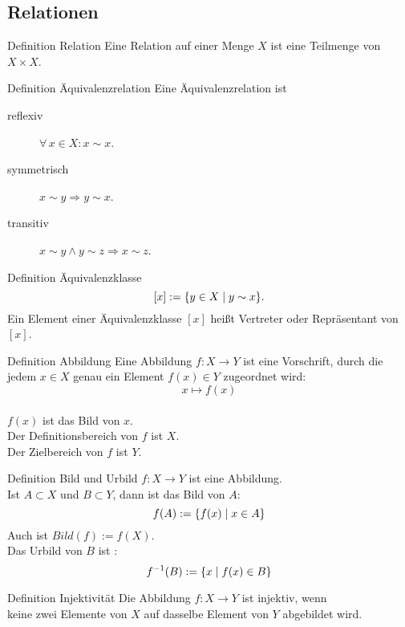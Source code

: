 \documentclass[a6paper,11pt,print,grid=front]{kartei}
\begin{document}
\subsection*{Relationen}
\begin{karte}{Definition Relation}
    Eine Relation auf einer Menge \(X\)  ist eine Teilmenge 
    von \( X \times X \).
\end{karte}
\begin{karte}{Definition Äquivalenzrelation}
    Eine Äquivalenzrelation ist 
    \begin{description}
        \item[reflexiv] \( \forall \, x \in X : x \sim x \).
        \item[symmetrisch] \( x \sim y \Rightarrow y \sim x \).
        \item[transitiv] \( x \sim y \wedge y \sim z \Rightarrow 
        x \sim z \).
    \end{description}
\end{karte}
\begin{karte}{Definition Äquivalenzklasse}
    \[ [ x ] := \{ y \in X \;\vert \; y \sim x \}. \]
    Ein Element einer Äquivalenzklasse \( [x] \) heißt 
    Vertreter oder Repräsentant von \( [x] \).
\end{karte}
\begin{karte}{Definition Abbildung}
    Eine Abbildung \(f : X \rightarrow Y\) ist eine Vorschrift, 
    durch die jedem \(x \in X \) genau ein Element \(f(x) \in Y\)
    zugeordnet wird:  \\
    \[ x \mapsto f(x)\] \\
     \( f(x)\) ist das Bild von \(x\). \\
    Der Definitionsbereich von \(f\) ist \(X\). \\
    Der Zielbereich von \(f\) ist \(Y\). 
\end{karte}
\begin{karte}{Definition Bild und Urbild}
    \(f : X \rightarrow Y\) ist eine Abbildung. \\
    Ist \(A \subset X\) und \(B \subset Y\),
     dann ist das Bild von \(A\):
    \[f(A) := \{ f(x) \;\vert \; x \in A \}\]
    Auch ist \(Bild(f) := f(X)\). \\
    Das Urbild von \(B\) ist : 
    \[f^{-1}(B) := \{x \;\vert \; f(x) \in B\}\]
\end{karte}
\begin{karte}{Definition Injektivität}
Die Abbildung \(f: X \rightarrow Y\) ist injektiv, wenn \\
keine zwei Elemente von \(X\) auf dasselbe Element von \(Y\) abgebildet wird. 
\end{karte}
\end{document}
